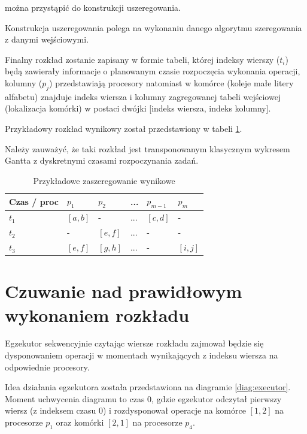 \documentclass[brudnopis]{xmgr}
\begin{document}
można przystąpić do konstrukcji uszeregowania.
\medskip

Konstrukcja uszeregowania polega na wykonaniu danego algorytmu szeregowania z danymi wejściowymi.
\medskip

Finalny rozkład zostanie zapisany w formie tabeli, której indeksy wierszy ($t_i$) będą zawierały informacje o planowanym czasie rozpoczęcia wykonania operacji, kolumny ($p_j$) przedstawiają procesory natomiast w komórce (koleje małe litery alfabetu) znajduje indeks wiersza i kolumny zagregowanej tabeli wejściowej (lokalizacja komórki) w postaci dwójki [indeks wiersza, indeks kolumny].
\medskip

Przykładowy rozkład wynikowy został przedstawiony w tabeli \ref{tab:example-sched-out}.
\medskip

Należy zauważyć, że taki rozkład jest transponowanym klasycznym wykresem Gantta z dyskretnymi czasami rozpoczynania zadań.

\begin{table}[!tbh]
\begin{tabular}{|l|l|l|l|l|l|} \hline
Czas / proc & $p_1$     & $p_2$     & ...   & $p_{m-1}$ & $p_{m}$ \\ \hline
$t_1$       & $[a,b]$   & -         & ...   & $[c,d]$   & - \\ \hline
$t_2$       & -         & $[e,f]$   & ...   & -         & - \\ \hline
$t_3$       & $[e,f]$   & $[g,h]$   & ...   & -         & $[i,j]$\\ \hline
\end{tabular}
\caption{Przykładowe zaszeregowanie wynikowe\label{tab:example-sched-out}}
\end{table}

\section{Czuwanie nad prawidłowym wykonaniem rozkładu}

Egzekutor sekwencyjnie czytając wiersze rozkładu zajmował będzie się dysponowaniem operacji w momentach wynikających z indeksu wiersza na odpowiednie procesory.
\medskip

Idea działania egzekutora została przedstawiona na diagramie \ref{diag:executor}. Moment uchwycenia diagramu 
to czas 0, gdzie egzekutor odczytał pierwszy wiersz (z indeksem czasu 0) i rozdysponował operacje na komórce $[1,2]$ na procesorze $p_1$ oraz komórki $[2,1]$ na procesorze $p_4$.
\medskip
\end{document}
